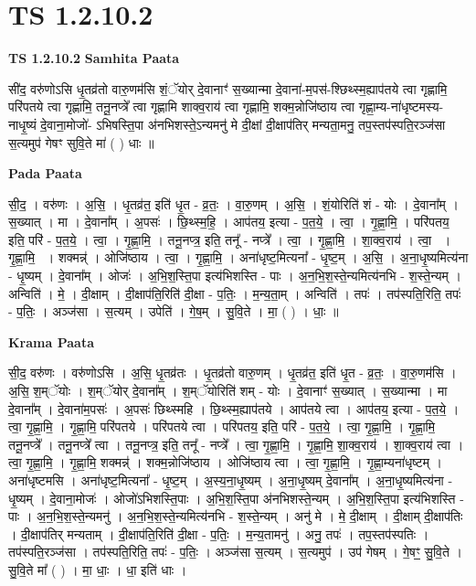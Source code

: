 \documentclass[17pt]{extarticle}
\begin{document}
\section*{ TS 1.2.10.2 }

\textbf{TS 1.2.10.2 } \newline
\textbf{Samhita Paata} \newline

सी॑द॒ वरु॑णोऽसि धृ॒तव्र॑तो वारु॒णम॑सि शं॒ॅयोर् दे॒वानाꣳ॑ स॒ख्यान्मा दे॒वाना॑-म॒पस॑-श्छिथ्स्म॒ह्याप॑तये त्वा गृह्णामि॒ परि॑पतये त्वा गृह्णामि॒ तनू॒नप्त्रे᳚ त्वा गृह्णामि शाक्व॒राय॑ त्वा गृह्णामि॒ शक्म॒न्नोजि॑ष्ठाय त्वा गृह्णा॒म्य-ना॑धृष्टमस्य-नाधृ॒ष्यं दे॒वाना॒मोजो॑- ऽभिषस्ति॒पा अ॑नभिशस्ते॒ऽन्यमनु॑ मे दी॒क्षां दी॒क्षाप॑तिर् मन्यता॒मनु॒ तप॒स्तप॑स्पति॒रञ्ज॑सा स॒त्यमुप॑ गेषꣳ सुवि॒ते मा॑ ( ) धाः ॥ \newline

\textbf{Pada Paata} \newline

सी॒द॒ । वरु॑णः । अ॒सि॒ । धृ॒तव्र॑त॒ इति॑ धृ॒त - व्र॒तः॒ । वा॒रु॒णम् । अ॒सि॒ । शं॒योरिति॑ शं - योः । दे॒वाना᳚म् । स॒ख्यात् । मा । दे॒वाना᳚म् । अ॒पसः॑ । छि॒थ्स्म॒हि॒ । आप॑तय॒ इत्या - प॒त॒ये॒ । त्वा॒ ।  गृ॒ह्णा॒मि॒ । परि॑पतय॒ इति॒ परि॑ - प॒त॒ये॒ । त्वा॒ । गृ॒ह्णा॒मि॒ । तनू॒नप्त्र॒ इति॒ तनू᳚ - नप्त्रे᳚ । त्वा॒ । गृ॒ह्णा॒मि॒ । शा॒क्व॒राय॑ । त्वा॒  । गृ॒ह्णा॒मि॒  । शक्मन्न्॑ । ओजि॑ष्ठाय । त्वा॒ । गृ॒ह्णा॒मि॒ । अना॑धृष्ट॒मित्यना᳚ - धृ॒ष्ट॒म् । अ॒सि॒ । अ॒ना॒धृ॒ष्यमित्य॑ना - धृ॒ष्यम् । दे॒वाना᳚म् । ओजः॑ । अ॒भि॒श॒स्ति॒पा इत्य॑भिशस्ति - पाः । अ॒न॒भि॒श॒स्ते॒न्यमित्य॑नभि - श॒स्ते॒न्यम् । अन्विति॑ । मे॒ । दी॒क्षाम् । दी॒क्षाप॑ति॒रिति॑ दी॒क्षा - प॒तिः॒ । म॒न्य॒ता॒म् । अन्विति॑ । तपः॑ । तप॑स्पति॒रिति॒ तपः॑ - प॒तिः॒ । अञ्ज॑सा । स॒त्यम् । उपेति॑ । गे॒ष॒म् । सु॒वि॒ते । मा॒ ( ) । धाः॒ ॥  \newline


\textbf{Krama Paata} \newline

सी॒द॒ वरु॑णः । वरु॑णोऽसि । अ॒सि॒ धृ॒तव्र॑तः । धृ॒तव्र॑तो वारु॒णम् । धृ॒तव्र॑त॒ इति॑ धृ॒त - व्र॒तः॒ । वा॒रु॒णम॑सि । अ॒सि॒ श॒म्ॅयोः । श॒म्ॅयोर् दे॒वाना᳚म् । श॒म्ॅयोरिति॑ शम् - योः । दे॒वानाꣳ॑ स॒ख्यात् । स॒ख्यान्मा । मा दे॒वाना᳚म् । दे॒वाना॑म॒पसः॑ । अ॒पसः॑ छिथ्स्महि । छि॒थ्स्म॒ह्याप॑तये । आप॑तये त्वा । आप॑तय॒ इत्या - प॒त॒ये॒ । त्वा॒ गृ॒ह्णा॒मि॒ । गृ॒ह्णा॒मि॒ परि॑पतये । परि॑पतये त्वा । परि॑पतय॒ इति॒ परि॑ - प॒त॒ये॒ । त्वा॒ गृ॒ह्णा॒मि॒ । गृ॒ह्णा॒मि॒ तनू॒नप्त्रे᳚ । तनू॒नप्त्रे᳚ त्वा । तनू॒नप्त्र॒ इति॒ तनू᳚ - नप्त्रे᳚ । त्वा॒ गृ॒ह्णा॒मि॒ । गृ॒ह्णा॒मि॒ शा॒क्व॒राय॑ । शा॒क्व॒राय॑ त्वा । त्वा॒ गृ॒ह्णा॒मि॒ । गृ॒ह्णा॒मि॒ शक्मन्न्॑ । शक्म॒न्नोजि॑ष्ठाय । ओजि॑ष्ठाय त्वा । त्वा॒ गृ॒ह्णा॒मि॒ । गृ॒ह्णा॒म्यना॑धृष्टम् । अना॑धृष्टमसि । अना॑धृष्ट॒मित्यना᳚ - धृ॒ष्ट॒म् । अ॒स्य॒ना॒धृ॒ष्यम् । अ॒ना॒धृ॒ष्यम् दे॒वाना᳚म् । अ॒ना॒धृ॒ष्यमित्य॑ना - धृ॒ष्यम् । दे॒वाना॒मोजः॑ । ओजो॑ऽभिशस्ति॒पाः । अ॒भि॒श॒स्ति॒पा अ॑नभिशस्ते॒न्यम् । अ॒भि॒श॒स्ति॒पा इत्य॑भिशस्ति - पाः । अ॒न॒भि॒श॒स्ते॒न्यमनु॑ । अ॒न॒भि॒श॒स्ते॒न्यमित्य॑नभि - श॒स्ते॒न्यम् । अनु॑ मे । मे॒ दी॒क्षाम् । दी॒क्षाम् दी॒क्षाप॑तिः । दी॒क्षाप॑तिर् मन्यताम् । दी॒क्षाप॑ति॒रिति॑ दी॒क्षा - प॒तिः॒ । म॒न्य॒तामनु॑ । अनु॒ तपः॑ । तप॒स्तप॑स्पतिः । तप॑स्पति॒रञ्ज॑सा । तप॑स्पति॒रिति॒ तपः॑ - प॒तिः॒ । अञ्ज॑सा स॒त्यम् । स॒त्यमुप॑ । उप॑ गेषम् । गे॒षꣳ॒॒ सु॒वि॒ते । सु॒वि॒ते मा᳚ ( ) । मा॒ धाः॒ । धा॒ इति॑ धाः । \newline
\end{document}
